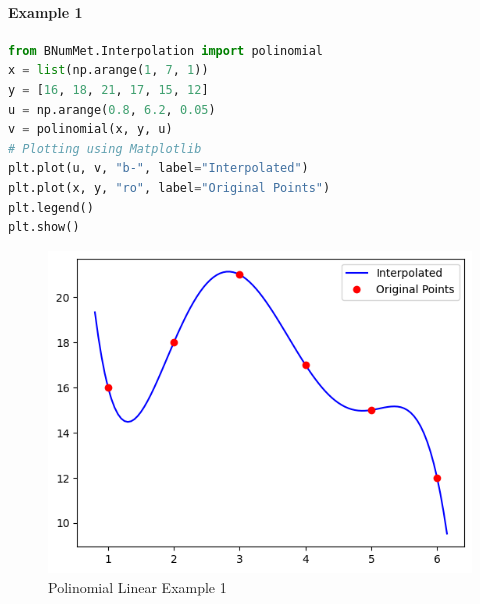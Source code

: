 \paragraph{Example 1}{
\begin{lstlisting}[language=Python]
from BNumMet.Interpolation import polinomial
x = list(np.arange(1, 7, 1))
y = [16, 18, 21, 17, 15, 12]
u = np.arange(0.8, 6.2, 0.05)
v = polinomial(x, y, u)
# Plotting using Matplotlib
plt.plot(u, v, "b-", label="Interpolated")
plt.plot(x, y, "ro", label="Original Points")
plt.legend()
plt.show()
\end{lstlisting}
\begin{figure}[H]
    \centering
    \includegraphics{Include/Images/Thesis/Documentation/Interpolation/Polinomial Example 1.png}
    \caption{Polinomial Linear Example 1}
    \label{fig:Polinomial Linear Example 1}
\end{figure}
}